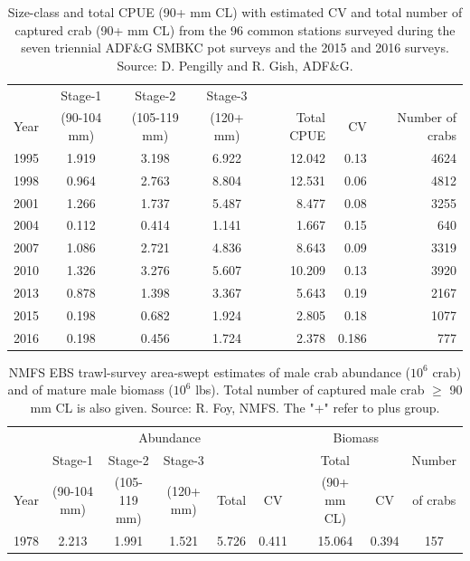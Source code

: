 \documentclass[]{article}
\begin{document}
\begin{table}[ht]
\centering
\caption{Size-class and total CPUE (90+ mm CL) with estimated CV and total number of captured crab (90+ mm CL) from the 96 common stations surveyed during the seven triennial ADF\&G SMBKC pot surveys and the 2015 and 2016 surveys. Source: D. Pengilly and R. Gish, ADF\&G.} 
\label{tab:stage_cpue}
\begin{tabular}{lcccrrr}
  \hline
       & Stage-1     & Stage-2      & Stage-3   &            &    & \\ 
  Year & (90-104 mm) & (105-119 mm) & (120+ mm) & Total CPUE & CV & Number of crabs \\ 
  \hline
  1995 & 1.919 & 3.198 & 6.922 & 12.042 & 0.13 & 4624 \\ 
  1998 & 0.964 & 2.763 & 8.804 & 12.531 & 0.06 & 4812 \\ 
  2001 & 1.266 & 1.737 & 5.487 & 8.477 & 0.08 & 3255 \\ 
  2004 & 0.112 & 0.414 & 1.141 & 1.667 & 0.15 & 640 \\ 
  2007 & 1.086 & 2.721 & 4.836 & 8.643 & 0.09 & 3319 \\ 
  2010 & 1.326 & 3.276 & 5.607 & 10.209 & 0.13 & 3920 \\ 
  2013 & 0.878 & 1.398 & 3.367 & 5.643 & 0.19 & 2167 \\ 
  2015 & 0.198 & 0.682 & 1.924 & 2.805 & 0.18 & 1077 \\ 
  2016 & 0.198 & 0.456 & 1.724 & 2.378 & 0.186 & 777 \\ 
   \hline
\end{tabular}
\end{table}\begin{table}[ht]
\centering
\caption{NMFS EBS trawl-survey area-swept estimates of male crab abundance ($10^6$ crab) and of mature male biomass ($10^6$ lbs). Total number of captured male crab $\ge$ 90 mm CL is also given. Source: R. Foy, NMFS. The "+" refer to plus group.} 
\label{tab:stage_cpue_nmfs}
\begin{tabular}{lccccccccc}
  \hline
       & \multicolumn{5}{c}{Abundance}                       & & \multicolumn{2}{c}{Biomass} & \\
  \cline{2-6}\cline{8-9}
       & Stage-1     & Stage-2      & Stage-3   &       &    & & Total       &               & Number \\ 
  Year & (90-104 mm) & (105-119 mm) & (120+ mm) & Total & CV & & (90+ mm CL) & CV            & of crabs \\ 
  \hline
  1978 & 2.213 & 1.991 & 1.521 & 5.726 & 0.411 & & 15.064 & 0.394 & 157 \\

\end{tabular}
\end{table}
\end{document}
